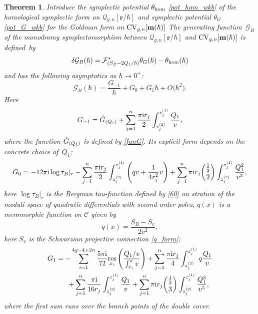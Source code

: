 \documentclass[pdftex]{sigma}
\numberwithin{equation}{section}
\newtheorem{Theorem}{Theorem}[section]
\theoremstyle{definition}
\begin{document}
\begin{Theorem}
Introduce the symplectic potential $\theta_{{\rm hom}}$ \eqref{pot_hom_wkb} of the homological symplectic form on $\mathcal{Q}_{g,n}[\mathbf{r}/\hbar]$ and symplectic potential $\theta_G$ \eqref{pot_G_wkb} for the Goldman form on ${\rm CV}_{g,n}[\mathbf{m}(\hbar)]$
The generating function~$\mathcal{G}_{B}$ of the monodromy symplectomorphism between $\mathcal{Q}_{g,n}[\mathbf{r}/\hbar]$ and ${\rm CV}_{g,n}[\mathbf{m}(\hbar)]$ is defined~by%
\begin{equation} \label{yang}
\delta \mathcal{G}_{B}(\hbar)=\mathcal{F}_{(S_B-{2Q_1}/{\hbar})}^*\theta_{G}(\hbar)-\theta_{{\rm hom}}(\hbar) \end{equation}
and has the following asymptotics
 as $\hbar \xrightarrow{} 0^+$:
\begin{equation*}\mathcal{G}_B(\hbar)=\frac{G_{-1}}{\hbar}+G_0+G_1 \hbar + O\big(\hbar^2\big).\end{equation*}
Here
\begin{equation*}G_{-1} =\Hat{G}_{(Q_1)}+\sum^n_{j=1}\frac{\pi{\rm i} r_j}{2}
\int^{z^{(1)}_j}_{z^{(2)}_j}\frac{{Q}_1}{v} , \end{equation*}
where the function $\Hat{G}_{(Q_1)}$ is defined by \eqref{funG}. Its explicit form depends on the concrete choice of~$Q_1$;
\begin{equation*}
G_{0}=-12 \pi{\rm i} \log \tau_B|_{r} -\sum^n_{j=1}\frac{\pi{\rm i} r_j}{2} \int^{z^{(1)}_j}_{z^{(2)}_j}\left(qv+\frac{1}{4r^2_j}v \right)+\sum^n_{j=1}
\pi{\rm i} r_j \binom{\frac{1}{2}}{2}\int^{z^{(1)}_j}_{z^{(2)}_j}\frac{{Q^2_1}}{v^{3}},
\end{equation*}
here $\log \tau_B|_{r}$ is the Bergman tau-function defined by \eqref{60} on stratum of the moduli space of quadratic differentials with second-order poles, $q(x)$ is a meromorphic function on $\mathcal{C}$ given by
\begin{equation*}q(x)=\frac{S_B-S_v}{2v^2}, \end{equation*}
here $S_v$ is the Schwarzian projective connection \eqref{q_form};
\begin{gather*}
G_1=-\sum^{4g-4+2n}_{i=1} \frac{5 \pi{\rm i}}{72}\underset{x_i}{\rm res}\left(\frac{Q_1/v}{\int^x_{x_i}v} \right)+\sum^{n}_{j=1}\frac{\pi{\rm i} r_j }{4}\int^{z^{(1)}_j}_{z^{(2)}_j} q\frac{Q_1}{v} \\
\hphantom{G_1=}{}
+\sum^{n}_{j=1}\frac{\pi{\rm i}}{16{r}_j}\int^{{z}^{(1)}_j}_{{z}^{(2)}_j}\frac{Q_1}{v}+\sum^n_{j=1}\pi{\rm i} r_j\binom{\frac{1}{2}}{3}
 \int^{z^{(1)}_j}_{z^{(2)}_j}\frac{Q^3_1}{v^{5}},
 \end{gather*}
where the first sum runs over the branch points of the double cover.
\end{Theorem}
\end{document}
